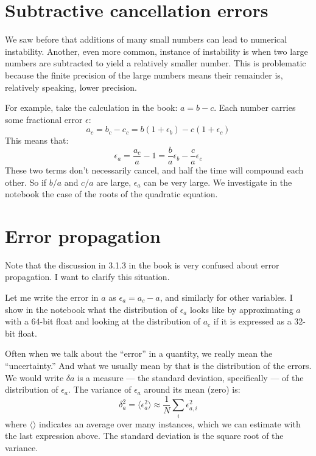 \section{Subtractive cancellation errors}

We saw before that additions of many small numbers can lead to
numerical instability. Another, even more common, instance of
instability is when two large numbers are subtracted to yield a
relatively smaller number. This is problematic because the finite
precision of the large numbers means their remainder is, relatively
speaking, lower precision.

For example, take the calculation in the book: $a = b - c$. 
Each number carries some fractional error $\epsilon$:
\begin{equation}
a_c = b_c - c_c = b(1+\epsilon_b) - c(1+\epsilon_c)
\end{equation}
This means that:
\begin{equation}
\epsilon_a = \frac{a_c}{a} - 1 = \frac{b}{a} \epsilon_b -
\frac{c}{a}\epsilon_c
\end{equation}
These two terms don't necessarily cancel, and half the time will
compound each other. So if $b/a$ and $c/a$ are large, $\epsilon_a$ can
be very large. We investigate in the notebook the case of the
roots of the quadratic equation.

\section{Error propagation}

Note that the discussion in 3.1.3 in the book is very confused about
error propagation. I want to clarify this situation.

Let me write the error in $a$ as $\epsilon_a = a_c - a$, and similarly
for other variables.  I show in the notebook what the distribution of
$\epsilon_a$ looks like by approximating $a$ with a 64-bit float and
looking at the distribution of $a_c$ if it is expressed as a 32-bit
float. 

Often when we talk about the ``error'' in a quantity, we really mean
the ``uncertainty.'' And what we usually mean by that is the
distribution of the errors.  We would write $\delta a$ is a measure
--- the standard deviation, specifically --- of the distribution of
$\epsilon_a$.  The variance of $\epsilon_a$ around its mean (zero) is:
\begin{equation}
\delta_a^2 = \langle \epsilon_a^2 \rangle \approx \frac{1}{N}\sum_i
\epsilon_{a,i}^2
\end{equation}
where $\langle\rangle$ indicates an average over many instances, which we
can estimate with the last expression above. The standard deviation is
the square root of the variance.

